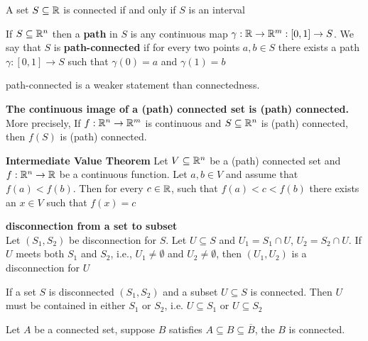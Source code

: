 \documentclass[11pt]{article}
\begin{document}
\begin{theorem}
  \label{intervals are connected in R}
  A set $S\subseteq \mathbb{R}$ is connected if and only if $S$ is an interval
\end{theorem}

\begin{defn}
  \label{path-connectedness}
  If $S\subseteq \mathbb{R}^n$ then a \textbf{path} in $S$ is any continuous map $\gamma: \mathbb{R} \rightarrow \mathbb{R}^m: [0,1]\rightarrow S$. We say that $S$ is \textbf{path-connected} if for every two points $a,b\in S$ there exists a path $\gamma: [0,1]\rightarrow S$ such that $\gamma(0) = a$ and $\gamma(1) = b$

  \begin{rem}
    path-connected is a weaker statement than connectedness.
  \end{rem}
\end{defn}

\begin{theorem}
  \label{continuous image of connected set is connected}
  \textbf{The continuous image of a (path) connected set is (path) connected.} More precisely, If $f: \mathbb{R}^n \rightarrow \mathbb{R}^m$ is continuous and $S\subseteq \mathbb{R}^n$ is (path) connected, then $f(S)$ is (path) connected.
\end{theorem}

\begin{theorem}
  \label{intemediate value theorem}
  \textbf{Intermediate Value Theorem} Let $V\subseteq \mathbb{R}^n$ be a (path) connected set and $f: \mathbb{R}^n \rightarrow \mathbb{R}$ be a continuous function. Let $a,b\in V$ and assume that $f(a) < f(b)$. Then for every $c\in \mathbb{R}$, such that $f(a) < c < f(b)$ there exists an $x\in V$ such that $f(x) = c$
\end{theorem}


\begin{theorem}
  \label{disconnection from a set to subset}
  \textbf{disconnection from a set to subset}\\
  Let $(S_1, S_2)$ be disconnection for $S$. Let $U\subseteq S$ and $U_1 = S_1\cap U$, $U_2 = S_2\cap U$. If $U$ meets both $S_1$ and $S_2$, i.e., $U_1 \not=\emptyset$ and $U_2 \not=\emptyset$, then $(U_1, U_2)$ is a disconnection for $U$

  \begin{corollary}
    If a set $S$ is disconnected $(S_1, S_2)$ and a subset $U\subseteq S$ is connected. Then $U$ must be contained in either $S_1$ or $S_2$, i.e. $U\subseteq S_1$ or $U\subseteq S_2$
  \end{corollary}

  \begin{corollary}
    Let $A$ be a connected set, suppose $B$ satisfies $A\subseteq B\subseteq \overline{B}$, the $B$ is connected.
  \end{corollary}
\end{theorem}
\end{document}
